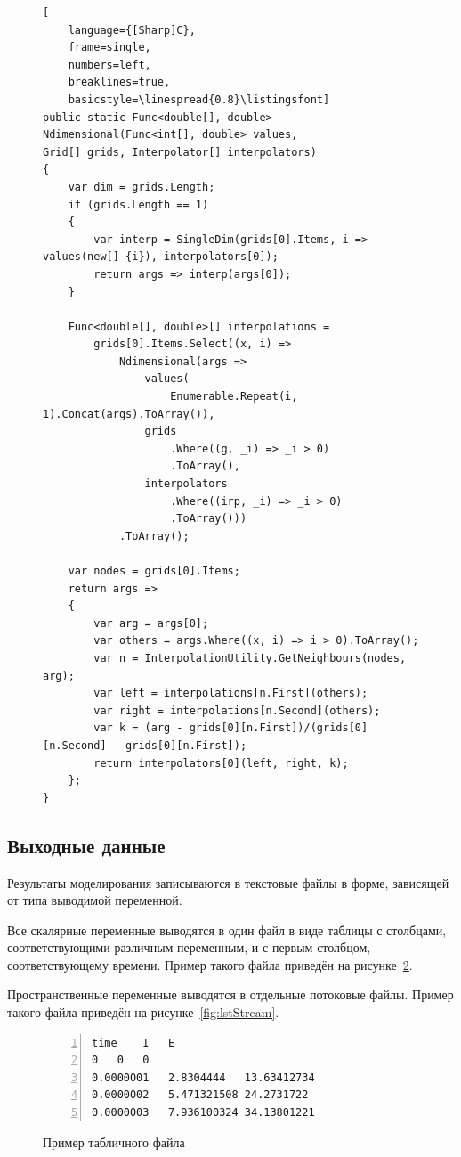 \begin{figure}
    \begin{lstlisting}[
    language={[Sharp]C},
    frame=single,
    numbers=left,
    breaklines=true,
    basicstyle=\linespread{0.8}\listingsfont]
public static Func<double[], double> Ndimensional(Func<int[], double> values, 
Grid[] grids, Interpolator[] interpolators)
{
    var dim = grids.Length;
    if (grids.Length == 1)
    {
        var interp = SingleDim(grids[0].Items, i => values(new[] {i}), interpolators[0]);
        return args => interp(args[0]);
    }

    Func<double[], double>[] interpolations =
        grids[0].Items.Select((x, i) =>
            Ndimensional(args =>
                values(
                    Enumerable.Repeat(i, 1).Concat(args).ToArray()),
                grids
                    .Where((g, _i) => _i > 0)
                    .ToArray(),
                interpolators
                    .Where((irp, _i) => _i > 0)
                    .ToArray()))
            .ToArray();

    var nodes = grids[0].Items;
    return args =>
    {
        var arg = args[0];
        var others = args.Where((x, i) => i > 0).ToArray();
        var n = InterpolationUtility.GetNeighbours(nodes, arg);
        var left = interpolations[n.First](others);
        var right = interpolations[n.Second](others);
        var k = (arg - grids[0][n.First])/(grids[0][n.Second] - grids[0][n.First]);
        return interpolators[0](left, right, k);
    };
}
    \end{lstlisting}
    \label{fig:lstSrcInterp}
\end{figure}


\subsection{Выходные данные}
Результаты моделирования записываются в текстовые файлы в форме, зависящей от 
типа выводимой переменной. 

Все скалярные переменные выводятся в один файл в виде таблицы с столбцами, 
соответствующими различным переменным, и с первым столбцом, соответствующему 
времени. Пример такого файла приведён на рисунке~\ref{fig:lstScalar}.

Пространственные переменные выводятся в отдельные потоковые файлы. Пример 
такого файла приведён на рисунке~\ref{fig:lstStream}.

\vspace{1.5cm}
\begin{figure}[h!]
    \centering
    \begin{lstlisting}[frame=single,numbers=left,breaklines=true]
time	I	E
0	0	0
0.0000001	2.8304444	13.63412734
0.0000002	5.471321508	24.2731722
0.0000003	7.936100324	34.13801221
    \end{lstlisting}
    \caption{Пример табличного файла}
    \label{fig:lstScalar}
\end{figure}

